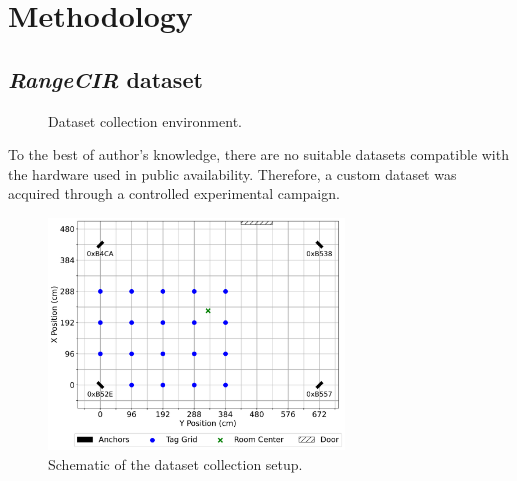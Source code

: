 \chapter{Methodology}

\section{\textit{RangeCIR} dataset}\label{data_collection}

\begin{figure}[tbh]
    \centering
    \caption{Dataset collection environment.}
    \label{fig:dataset_setup}
\end{figure} 

To the best of author's knowledge, there are no suitable datasets compatible with the hardware used in public availability. Therefore, a custom dataset was acquired through a controlled experimental campaign. 

\begin{figure}[tbh]
\hspace*{-1cm}
\includegraphics[width=0.7\textwidth]{Graphics/uwb_topology.pdf}
\centering
\caption{Schematic of the dataset collection setup.}
\label{fig:exp_topology}
\end{figure}

